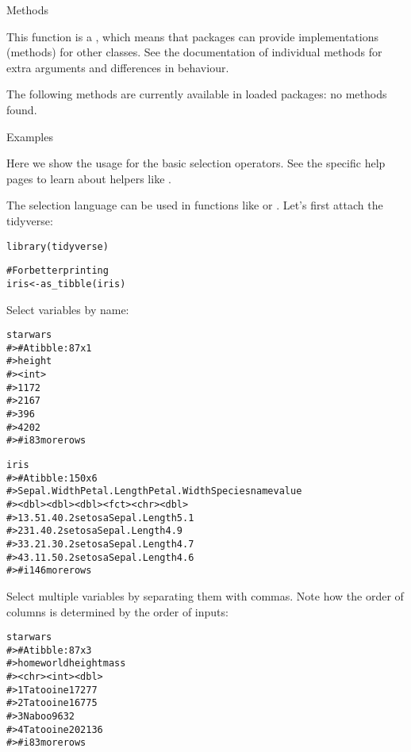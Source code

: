 \documentclass[a4paper]{book}
\begin{document}
%
\begin{Section}{Methods}

This function is a , which means that packages can provide
implementations (methods) for other classes. See the documentation of
individual methods for extra arguments and differences in behaviour.

The following methods are currently available in loaded packages:
no methods found.
\end{Section}
%
\begin{Section}{Examples}


Here we show the usage for the basic selection operators. See the
specific help pages to learn about helpers like .

The selection language can be used in functions like
 or . Let's first attach
the tidyverse:

\begin{alltt}library(tidyverse)

# For better printing
iris <- as_tibble(iris)
\end{alltt}


Select variables by name:

\begin{alltt}starwars %>% select(height)
#> # A tibble: 87 x 1
#>   height
#>    <int>
#> 1    172
#> 2    167
#> 3     96
#> 4    202
#> # i 83 more rows

iris %>% pivot_longer(Sepal.Length)
#> # A tibble: 150 x 6
#>   Sepal.Width Petal.Length Petal.Width Species name         value
#>         <dbl>        <dbl>       <dbl> <fct>   <chr>        <dbl>
#> 1         3.5          1.4         0.2 setosa  Sepal.Length   5.1
#> 2         3            1.4         0.2 setosa  Sepal.Length   4.9
#> 3         3.2          1.3         0.2 setosa  Sepal.Length   4.7
#> 4         3.1          1.5         0.2 setosa  Sepal.Length   4.6
#> # i 146 more rows
\end{alltt}


Select multiple variables by separating them with commas. Note how
the order of columns is determined by the order of inputs:

\begin{alltt}starwars %>% select(homeworld, height, mass)
#> # A tibble: 87 x 3
#>   homeworld height  mass
#>   <chr>      <int> <dbl>
#> 1 Tatooine     172    77
#> 2 Tatooine     167    75
#> 3 Naboo         96    32
#> 4 Tatooine     202   136
#> # i 83 more rows
\end{alltt}



\end{Section}
\end{document}
